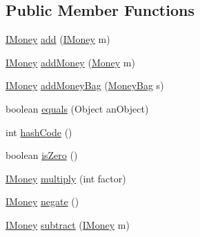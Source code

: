 \subsection*{Public Member Functions}
\begin{DoxyCompactItemize}
\item 
\mbox{\hyperlink{interfacees_1_1deusto_1_1testing_1_1junit_1_1_i_money}{I\+Money}} \mbox{\hyperlink{classes_1_1deusto_1_1testing_1_1junit_1_1_money_bag_ab3be83ff12fa6d19b67b669194120d00}{add}} (\mbox{\hyperlink{interfacees_1_1deusto_1_1testing_1_1junit_1_1_i_money}{I\+Money}} m)
\item 
\mbox{\hyperlink{interfacees_1_1deusto_1_1testing_1_1junit_1_1_i_money}{I\+Money}} \mbox{\hyperlink{classes_1_1deusto_1_1testing_1_1junit_1_1_money_bag_a06ecedbf53ba09d34276fe177e3169bc}{add\+Money}} (\mbox{\hyperlink{classes_1_1deusto_1_1testing_1_1junit_1_1_money}{Money}} m)
\item 
\mbox{\hyperlink{interfacees_1_1deusto_1_1testing_1_1junit_1_1_i_money}{I\+Money}} \mbox{\hyperlink{classes_1_1deusto_1_1testing_1_1junit_1_1_money_bag_ab329e6a2811b83a2b1670b79be92249d}{add\+Money\+Bag}} (\mbox{\hyperlink{classes_1_1deusto_1_1testing_1_1junit_1_1_money_bag}{Money\+Bag}} s)
\item 
boolean \mbox{\hyperlink{classes_1_1deusto_1_1testing_1_1junit_1_1_money_bag_a80926d10c9619bd2ad84eabe52ca03bb}{equals}} (Object an\+Object)
\item 
int \mbox{\hyperlink{classes_1_1deusto_1_1testing_1_1junit_1_1_money_bag_ae2c0d290a37a617f0a07134bf95162eb}{hash\+Code}} ()
\item 
boolean \mbox{\hyperlink{classes_1_1deusto_1_1testing_1_1junit_1_1_money_bag_abebc5bc39c3343cb3c4e5fb291fd5893}{is\+Zero}} ()
\item 
\mbox{\hyperlink{interfacees_1_1deusto_1_1testing_1_1junit_1_1_i_money}{I\+Money}} \mbox{\hyperlink{classes_1_1deusto_1_1testing_1_1junit_1_1_money_bag_aa20ce4cc70c2ba0bc9a5ccb96635d506}{multiply}} (int factor)
\item 
\mbox{\hyperlink{interfacees_1_1deusto_1_1testing_1_1junit_1_1_i_money}{I\+Money}} \mbox{\hyperlink{classes_1_1deusto_1_1testing_1_1junit_1_1_money_bag_abf06bf97e548f95038756608fe0c8351}{negate}} ()
\item 
\mbox{\hyperlink{interfacees_1_1deusto_1_1testing_1_1junit_1_1_i_money}{I\+Money}} \mbox{\hyperlink{classes_1_1deusto_1_1testing_1_1junit_1_1_money_bag_a7f1803fe267edca895cdf752b5f46560}{subtract}} (\mbox{\hyperlink{interfacees_1_1deusto_1_1testing_1_1junit_1_1_i_money}{I\+Money}} m)

\end{DoxyCompactItemize}
